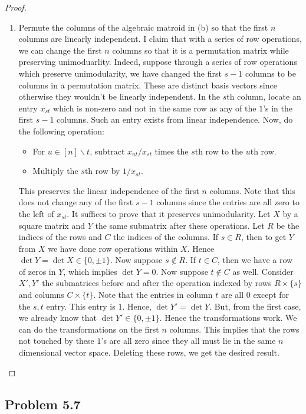 \documentclass[12pt]{article}
\begin{document}
\begin{proof}
\begin{enumerate}[label = (\alph*)]
		\item Permute the columns of the algebraic matroid in (b) so that the first $n$ columns are linearly independent. I claim that with a series of row operations, we can change the first $n$ columns so that it is a permutation matrix while preserving unimoduarlity. Indeed, suppose through a series of row operations which preserve unimodularity, we have changed the first $s-1$ columns to be columns in a permutation matrix. These are distinct basis vectors since otherwise they wouldn't be linearly independent. In the $s$th column, locate an entry $x_{st}$ which is non-zero and not in the same row as any of the $1$'s in the first $s-1$ columns. Such an entry exists from linear independence. Now, do the following operation:
		\begin{itemize}
			\item For $u \in [n] \backslash t$, subtract $x_{ut} / x_{st}$ times the $s$th row to the $u$th row. 
			\item Multiply the $s$th row by $1/x_{st}$. 
		\end{itemize}
		This preserves the linear independence of the first $n$ columns. Note that this does not change any of the first $s-1$ columns since the entries are all zero to the left of $x_{st}$. It suffices to prove that it preserves unimodularity. Let $X$ by a square matrix and $Y$ the same submatrix after these operations. Let $R$ be the indices of the rows and $C$ the indices of the columns. If $s \in R$, then to get $Y$ from $X$ we have done row operations within $X$. Hence $\det Y = \det X \in \{0, \pm 1\}$. Now suppose $s \notin R$. If $t \in C$, then we have a row of zeros in $Y$, which implies $\det Y = 0$. Now suppose $t \notin C$ as well. Consider $X', Y'$ the submatrices before and after the operation indexed by rows $R \times \{s\}$ and columns $C \times \{t\}$. Note that the entries in column $t$ are all $0$ except for the $s, t$ entry. This entry is $1$. Hence, $\det Y' = \det Y$. But, from the first case, we already know that $\det Y' \in \{0, \pm 1\}$. Hence the transformations work. We can do the transformations on the first $n$ columns. This implies that the rows not touched by these $1$'s are all zero since they all must lie in the same $n$ dimensional vector space. Deleting these rows, we get the desired result. 
	\end{enumerate}
\end{proof}

\newpage 

\subsection{Problem 5.7}
\end{document}
